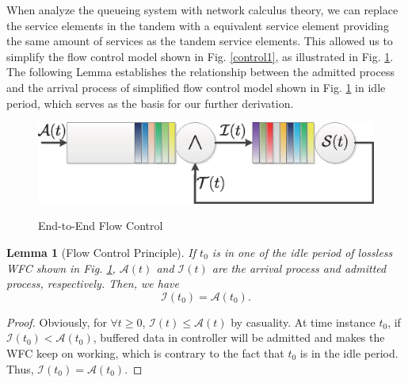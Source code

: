\documentclass[12pt]{article}
\newtheorem{lemma}{Lemma}
\newtheorem{proof}{Proof}
\begin{document}
When analyze the queueing system with network calculus theory, we can replace the service elements in the tandem with a equivalent service element providing the same amount of services as the tandem service elements. This allowed us to simplify the flow control model shown in Fig. \ref{control1}, as illustrated in Fig. \ref{control2}. The following Lemma establishes the relationship between the admitted process and the arrival process of simplified flow control model shown in Fig. \ref{control2} in idle period, which serves as the basis for our further derivation.
\begin{figure}[ht]
  \centering\includegraphics[scale=0.45]{figures/QueueModel2.eps}\\
  \caption{End-to-End Flow Control}\label{control2}
\end{figure}

\begin{lemma}[Flow Control Principle]\label{lama1}
If $t_0$ is in one of the idle period of lossless WFC shown in Fig. \ref{control2}, $\mathcal{A}(t)$ and $\mathcal{I}(t)$ are the arrival process and admitted process, respectively. Then, we have
\begin{equation}
\mathcal{I}(t_0)=\mathcal{A}(t_0).
\end{equation}
\end{lemma}
\begin{proof}
Obviously, for $\forall t\geq 0$, $\mathcal{I}(t)\leq \mathcal{A}(t)$ by casuality. At time instance $t_0$, if $\mathcal{I}(t_0)<\mathcal{A}(t_0)$, buffered data in controller will be admitted and makes the WFC keep on working, which is contrary to the fact that $t_0$ is in the idle period. Thus, $\mathcal{I}(t_0)=\mathcal{A}(t_0)$.
\end{proof}
\end{document}
